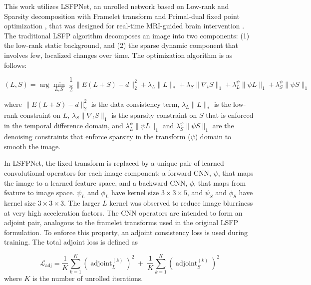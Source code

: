 \documentclass[runningheads]{llncs}
\begin{document}
This work utilizes LSFPNet, an unrolled network based on Low-rank and Sparsity decomposition with Framelet transform and Primal-dual fixed point optimization \cite{9678015}, that was designed for real-time MRI-guided brain intervention \cite{He2023Unrolled}. The traditional LSFP algorithm decomposes an image into two components: (1) the low-rank static background, and (2) the sparse dynamic component that involves few, localized changes over time. The optimization algorithm is as follows:


\[
(L,S)
= \arg\min_{L,S}\;
\frac{1}{2}\,\big\lVert E(L+S)-d \big\rVert_2^2
+ \lambda_L \lVert L\rVert_\ast
+ \lambda_S \big\lVert \nabla_t S \big\rVert_1
+ \lambda_L^\psi \lVert \psi L \rVert_1
+ \lambda_S^\psi \lVert \psi S \rVert_1
\]

where $\big\lVert E(L+S)-d \big\rVert_2^2$ is the data consistency term, $\lambda_L \lVert L\rVert_\ast$ is the low-rank constraint on $L$, $\lambda_S \big\lVert \nabla_t S \big\rVert_1$ is the sparsity constraint on $S$ that is enforced in the temporal difference domain, and $\lambda_L^\psi \lVert \psi L \rVert_1$ and $\lambda_S^\psi \lVert \psi S \rVert_1$ are the denoising constraints that enforce sparsity in the transform ($\psi$) domain to smooth the image. 

In LSFPNet, the fixed transform is replaced by a unique pair of learned convolutional operators for each image component: a forward CNN, $\psi$, that maps the image to a learned feature space, and a backward CNN, $\phi$, that maps from feature to image space. $\psi_L$ and $\phi_L$ have kernel size $3 \times 3 \times 5$, and $\psi_S$ and $\phi_S$ have kernel size $3 \times 3 \times3$. The larger $L$ kernel was observed to reduce image blurriness at very high acceleration factors. The CNN operators are intended to form an adjoint pair, analogous to the framelet transforms used in the original LSFP formulation. To enforce this property, an adjoint consistency loss is used during training. The total adjoint loss is defined as 

\[
\mathcal{L}_{\mathrm{adj}}
= \frac{1}{K}\sum_{k=1}^{K}
\left(\operatorname{adjoint}_L^{(k)}\right)^2
\;+\;
\frac{1}{K}\sum_{k=1}^{K}
\left(\operatorname{adjoint}_S^{(k)}\right)^2 
\]
where $K$ is the number of unrolled iterations. 
\end{document}
